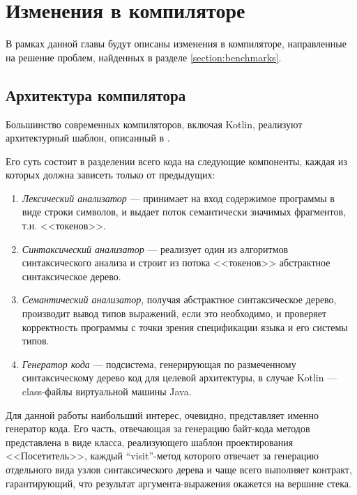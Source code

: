 \newpage
\section{Изменения в компиляторе}
В рамках данной главы будут описаны изменения в компиляторе, направленные на решение проблем,
найденных в разделе \ref{section:benchmarks}.

\subsection{Архитектура компилятора}
Большинство современных компиляторов, включая Kotlin, реализуют архитектурный шаблон, описанный
в \cite{Muchnick}.

Его суть состоит в разделении всего кода на следующие компоненты, каждая из которых должна зависеть
только от предыдущих:
\begin{enumerate}
    \item \textit{Лексический анализатор} --- принимает на вход содержимое программы в виде строки
    символов, и выдает поток семантически значимых фрагментов, т.н. <<токенов>>.

    \item \textit{Синтаксический анализатор} --- реализует один из алгоритмов синтаксического
    анализа и строит из потока <<токенов>> абстрактное синтаксическое дерево.

    \item \textit{Семантический анализатор}, получая абстрактное синтаксическое дерево, производит
    вывод типов выражений, если это необходимо, и проверяет корректность программы с точки зрения
    спецификации языка и его системы типов.

    \item \textit{Генератор кода} --- подсистема, генерирующая по размеченному синтаксическому
    дерево код для целевой архитектуры, в случае Kotlin --- class-файлы виртуальной машины Java.
\end{enumerate}

Для данной работы наибольший интерес, очевидно, представляет именно генератор кода.
Его часть, отвечающая за генерацию байт-кода методов представлена в виде класса, реализующего
шаблон проектирования <<Посетитель>>\cite{Gamma}, каждый ``visit''-метод которого отвечает за
генерацию отдельного вида узлов синтаксического дерева и чаще всего выполняет контракт,
гарантирующий, что результат аргумента-выражения окажется на вершине стека.

